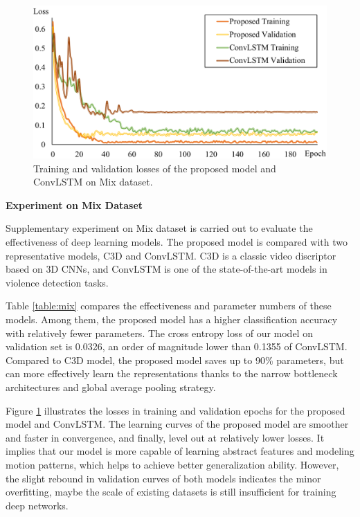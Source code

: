 \documentclass[10pt,twocolumn,letterpaper]{article}
\begin{document}
\begin{figure}[t]
\begin{center}
\includegraphics[scale=0.46]{fig/fig3.png}
\end{center}
\caption{Training and validation losses of the proposed model and ConvLSTM \cite{convlstm_sudh} on Mix dataset.}
\label{fig:mix}
\end{figure}


\noindent\textbf{Experiment on Mix Dataset}

Supplementary experiment on Mix dataset is carried out to evaluate the effectiveness of deep learning models.
The proposed model is compared with two representative models, C3D and ConvLSTM.
C3D \cite{3dcnn_1} is a classic video discriptor based on 3D CNNs, and ConvLSTM \cite{convlstm_sudh} is one of the state-of-the-art models in violence detection tasks.

Table \ref{table:mix} compares the effectiveness and parameter numbers of these models.
Among them, the proposed model has a higher classification accuracy with relatively fewer parameters.
The cross entropy loss of our model on validation set is 0.0326, an order of magnitude lower than 0.1355 of ConvLSTM.
Compared to C3D model, the proposed model saves up to 90\% parameters, but can more effectively learn the representations thanks to the narrow bottleneck architectures and global average pooling strategy.

Figure \ref{fig:mix} illustrates the losses in training and validation epochs for the proposed model and ConvLSTM.
The learning curves of the proposed model are smoother and faster in convergence, and finally, level out at relatively lower losses.
It implies that our model is more capable of learning abstract features and modeling motion patterns, which helps to achieve better generalization ability.
However, the slight rebound in validation curves of both models indicates the minor overfitting, maybe the scale of existing datasets is still insufficient for training deep networks. 
\end{document}
